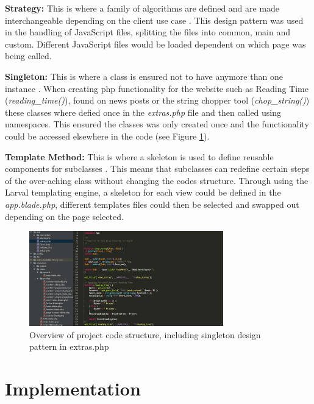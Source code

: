 \documentclass[fontsize=10pt]{extarticle}
\numberwithin{figure}{section} %
\begin{document}
\textbf{Strategy:} This is where a family of algorithms are defined and
are made interchangeable depending on the client use case
\cite{gamma1995design}. This design pattern was used in the handling of
JavaScript files, splitting the files into common, main and custom.
Different JavaScript files would be loaded dependent on which page was
being called.

\textbf{Singleton:} This is where a class is ensured not to have anymore
than one instance \cite{gamma1995design}. When creating php
functionality for the website such as Reading Time
(\emph{reading\_time()}), found on news posts or the string chopper tool
(\emph{chop\_string()}) these classes where defied once in the
\emph{extras.php} file and then called using namespaces. This ensured
the classes was only created once and the functionality could be
accessed elsewhere in the code (see Figure \ref{ddcode}).

\textbf{Template Method:} This is where a skeleton is used to define
reusable components for subclasses \cite{gamma1995design}. This means
that subclasses can redefine certain steps of the over-aching class
without changing the codes structure. Through using the Larval
templating engine, a skeleton for each view could be defined in the
\emph{app.blade.php}, different templates files could then be selected
and swapped out depending on the page selected.

\begin{figure}[H]
\centering
\includegraphics[trim = 0 0 0 0, clip, width=0.75\textwidth]{ddcode.png}
\caption{Overview of project code structure, including singleton design pattern in extras.php}
\label{ddcode}
\end{figure}

\newpage

\hypertarget{implementation}{%
\section{Implementation}\label{implementation}}
\end{document}
